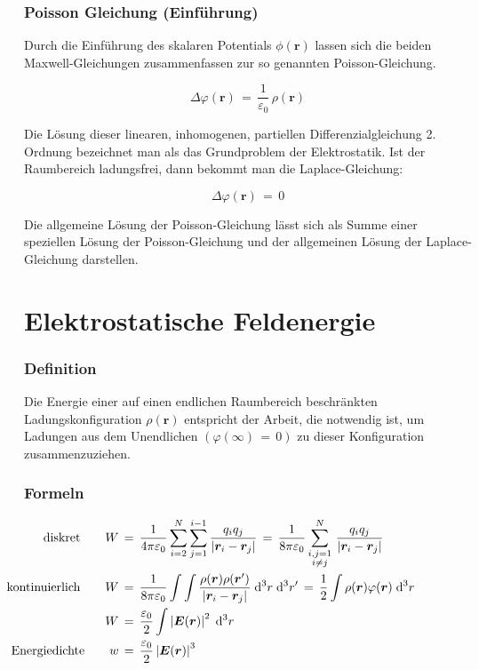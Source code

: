 \documentclass[titlepage,11pt,a4paper,ngerman]{report}
\renewcommand{\vec}[1]{\bm{#1}}
\renewcommand{\epsilon}{\varepsilon}
\renewcommand{\paragraph}[1]{\subsubsection{#1}}
\begin{document}
\paragraph{Poisson Gleichung (Einführung)}
Durch die Einführung  des skalaren Potentials $\phi(\vec{r})$ lassen sich die beiden Maxwell-Gleichungen zusammenfassen zur so genannten Poisson-Gleichung.

\[\Delta\varphi(\vec{r})\,=\,\frac{1}{\epsilon_0}\,\rho(\vec{r})\]

Die Lösung dieser linearen, inhomogenen, partiellen Differenzialgleichung 2. Ordnung bezeichnet man als das Grundproblem der Elektrostatik. Ist der Raumbereich ladungsfrei, dann bekommt man die Laplace-Gleichung:

\[\Delta\varphi(\vec{r})\,=\,0\]

Die allgemeine Lösung der Poisson-Gleichung lässt sich als Summe einer speziellen Lösung der Poisson-Gleichung und der allgemeinen Lösung der Laplace-Gleichung darstellen.

\section{Elektrostatische Feldenergie}
\paragraph{Definition}
Die Energie einer auf einen endlichen Raumbereich beschränkten Ladungskonfiguration $\rho(\vec{r})$ entspricht der Arbeit, die notwendig ist, um Ladungen aus dem Unendlichen $(\varphi(\infty)\,=\,0)$ zu dieser Konfiguration zusammenzuziehen.

\paragraph{Formeln}
\begin{align*}
\llap{diskret}\qquad W\,&=\,\frac{1}{4\pi\epsilon_0}\sum_{i=2}^{N}\sum_{j=1}^{i-1}\frac{q_i q_j}{\left|\vec{r}_i - \vec{r}_j \right|}\,=\,\frac{1}{8\pi\epsilon_0}\sum_{\substack{i,j=1\\ i\neq j}}^{N}\,\frac{q_i q_j}{\left|\vec{r}_i - \vec{r}_j \right|}\\
\llap{kontinuierlich}\qquad W\,&=\,\frac{1}{8\pi\epsilon_0}\int\int\frac{\rho(\vec{r})\rho(\vec{r}')}{\left|\vec{r}_i - \vec{r}_j \right|}\;\mathrm{d}^3r\;\mathrm{d}^3r'\,=\,\frac{1}{2}\int\rho(\vec{r})\varphi(\vec{r})\;\mathrm{d}^3r\\
W\,&=\,\frac{\epsilon_0}{2}\int\left|\vec{E}(\vec{r})\right|^2\;\mathrm{d}^3r\\
\llap{Energiedichte}\qquad w\,&=\,\frac{\epsilon_0}{2}\left|\vec{E}(\vec{r})\right|^3
\end{align*}
\end{document}
